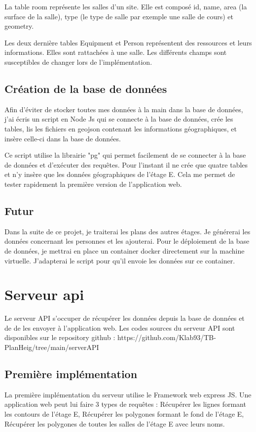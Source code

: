 \documentclass[
    iai, %
    il, %
]{heig-tb}
\begin{document}
La table room représente les salles d'un site.
Elle est composé id, name, area (la surface de la salle), type (le type de salle par exemple une salle de cours) et geometry.

Les deux dernière tables Equipment et Person représentent des ressources et leurs informations. Elles sont rattachées à une salle.
Les différents champs sont susceptibles de changer lors de l'implémentation.

\section{Création de la base de données}
Afin d'éviter de stocker toutes mes données à la main dans la base de données,
j'ai écris un script en Node Js qui se connecte à la base de données, crée les tables,
lis les fichiers en geojson contenant les informations géographiques,
et insère celle-ci dans la base de données.

Ce script utilise la librairie "pg" qui permet facilement de se connecter à la base de données et d'exécuter des requêtes.
Pour l'instant il ne crée que quatre tables et n'y insère que les données géographiques de l'étage E.
Cela me permet de tester rapidement la première version de l'application web.

\section{Futur}
Dans la suite de ce projet, je traiterai les plans des autres étages.
Je générerai les données concernant les personnes et les ajouterai.
Pour le déploiement de la base de données, je mettrai en place un container docker directement sur la machine virtuelle.
J'adapterai le script pour qu'il envoie les données sur ce container.

\chapter{Serveur api}
Le serveur API s'occuper de récupérer les données depuis la base de données et de de les envoyer à l'application web.
Les codes sources du serveur API sont disponibles sur le repository github : https://github.com/Klab93/TB-PlanHeig/tree/main/serverAPI

\section{Première implémentation}
La première implémentation du serveur utilise le Framework web express JS.
Une application web peut lui faire 3 types de requêtes :
Récupérer les lignes formant les contours de l'étage E,
Récupérer les polygones formant le fond de l'étage E,
Récupérer les polygones de toutes les salles de l'étage E avec leurs noms.
\end{document}
